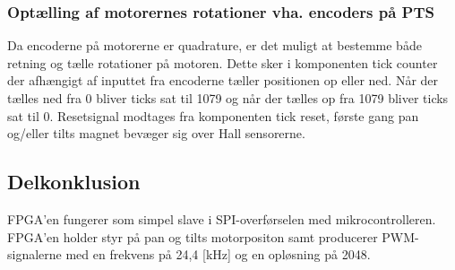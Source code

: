 \subsubsection{Optælling af motorernes rotationer vha. encoders på PTS}
Da encoderne på motorerne er quadrature,
er det muligt at bestemme både retning og tælle rotationer på motoren. 
Dette sker i komponenten tick counter der afhængigt af inputtet fra encoderne tæller positionen op eller 
ned.
Når der tælles ned fra 0 bliver ticks sat til 1079 
og når der tælles op fra 1079 bliver ticks sat til 0.
Resetsignal modtages fra komponenten tick reset, første gang pan og/eller tilts magnet bevæger 
sig over Hall sensorerne.

\subsection{Delkonklusion}
FPGA'en fungerer som simpel slave i SPI-overførselen med mikrocontrolleren.
FPGA'en holder styr på pan og tilts motorpositon samt producerer PWM-signalerne 
med en frekvens på 24,4 [kHz] og en opløsning på 2048.
